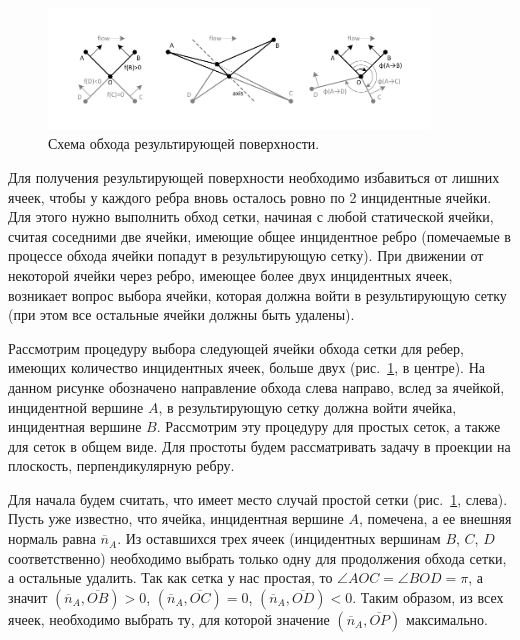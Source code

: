\begin{figure}[h]
\centering
\includegraphics[width=0.9\textwidth]{pics/text_1_int/pic_walk_1.pdf}
\caption{Схема обхода результирующей поверхности.}
\label{fig:text_1_int_walk}
\end{figure}

Для получения результирующей поверхности необходимо избавиться от лишних ячеек, чтобы у каждого ребра вновь осталось ровно по 2 инцидентные ячейки.
Для этого нужно выполнить обход сетки, начиная с любой статической ячейки, считая соседними две ячейки, имеющие общее инцидентное ребро (помечаемые в процессе обхода ячейки попадут в результирующую сетку).
При движении от некоторой ячейки через ребро, имеющее более двух инцидентных ячеек, возникает вопрос выбора ячейки, которая должна войти в результирующую сетку (при этом все остальные ячейки должны быть удалены).

Рассмотрим процедуру выбора следующей ячейки обхода сетки для ребер, имеющих количество инцидентных ячеек, больше двух (рис.~\ref{fig:text_1_int_walk}, в центре).
На данном рисунке обозначено направление обхода слева направо, вслед за ячейкой, инцидентной вершине $A$, в результирующую сетку должна войти ячейка, инцидентная вершине $B$.
Рассмотрим эту процедуру для простых сеток, а также для сеток в общем виде.
Для простоты будем рассматривать задачу в проекции на плоскость, перпендикулярную ребру.

Для начала будем считать, что имеет место случай простой сетки (рис.~\ref{fig:text_1_int_walk}, слева).
Пусть уже известно, что ячейка, инцидентная вершине $A$, помечена, а ее внешняя нормаль равна $\overline{n}_A$.
Из оставшихся трех ячеек (инцидентных вершинам $B$, $C$, $D$ соответственно) необходимо выбрать только одну для продолжения обхода сетки, а остальные удалить.
Так как сетка у нас простая, то $\angle AOC = \angle BOD = \pi$, а значит $(\overline{n}_A, \overline{OB}) > 0$, $(\overline{n}_A, \overline{OC}) = 0$, $(\overline{n}_A, \overline{OD}) < 0$.
Таким образом, из всех ячеек, необходимо выбрать ту, для которой значение $(\overline{n}_A, \overline{OP})$ максимально.

